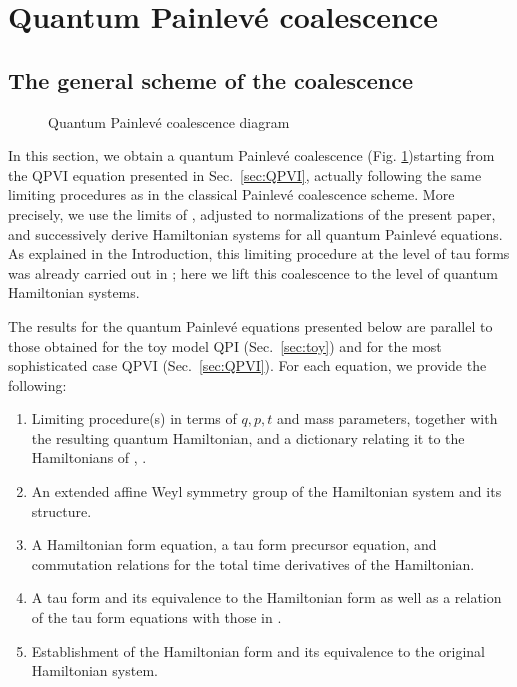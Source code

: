 \documentclass[12pt,a4paper]{article}
\numberwithin{equation}{section}
\begin{document}
\section{Quantum Painlev\'e coalescence}
\label{sec:coalescence}
\setcounter{subsection}{-1}
\subsection{The general scheme of the coalescence}

\begin{figure}[H]
\begin{center}
\end{center}
\caption{Quantum Painlev\'e coalescence diagram}
	        
         \label{fig:QPainleve_coalescence}              
\end{figure} 

In this section, we obtain a quantum Painlev\'e coalescence (Fig. \ref{fig:QPainleve_coalescence})starting from the QPVI equation presented in  Sec.~\ref{sec:QPVI}, actually following the same limiting procedures as in the classical Painlev\'e coalescence scheme. More precisely, we use the limits of \cite[App. D]{BST25}, adjusted to normalizations of the present paper, and successively derive Hamiltonian systems for all quantum Painlev\'e equations. As explained in the Introduction, this limiting procedure at the level of tau forms was already carried out in \cite[Sec. 3.1,3.2]{BST25}; here we 
lift this coalescence to the level of
quantum Hamiltonian systems. 

The results for the quantum Painlevé equations presented below are parallel to those obtained for the toy model QPI (Sec.~\ref{sec:toy}) and for the most sophisticated case QPVI (Sec.~\ref{sec:QPVI}). For each equation, we provide the following:
\begin{enumerate}
    \item Limiting procedure(s) in terms of $q,p,t$ and mass parameters, together with the resulting quantum Hamiltonian, and a dictionary relating it to the Hamiltonians of \cite{NY12}, \cite{N12}. 
    \item An extended affine Weyl symmetry group of the Hamiltonian system and its structure. 
    \item A Hamiltonian form equation, a tau form precursor equation, and commutation relations for the total time derivatives of the Hamiltonian.
    \item A tau form and its equivalence to the Hamiltonian form as well as a relation of the tau form equations with those in \cite{BST25}.
    \item Establishment of the Hamiltonian form and its equivalence to the original Hamiltonian system.
\end{enumerate}
\end{document}
